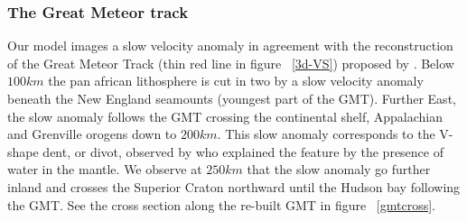 \documentclass[12pt]{article}
\begin{document}



\subsubsection{The Great Meteor track}

	Our model images a slow velocity anomaly in agreement with the reconstruction of the Great Meteor Track (thin red line in figure ~\ref{3d-VS}) proposed by \cite{heaman2000timing}.
	Below $100km$ the pan african lithosphere is cut in two by a slow velocity anomaly beneath the New England seamounts (youngest part of the GMT). Further East, the slow anomaly follows the GMT crossing the continental shelf, Appalachian and Grenville orogens down to $200km$. 
	This slow anomaly corresponds to the V-shape dent, or divot, observed by \cite{lee1997upper} who explained the feature by the presence of water in the mantle. 
	We observe at $250km$ that the slow anomaly go further inland and crosses the Superior Craton northward until the Hudson bay following the GMT.
	See the cross section along the re-built GMT in figure ~\ref{gmtcross}.
\end{document}
